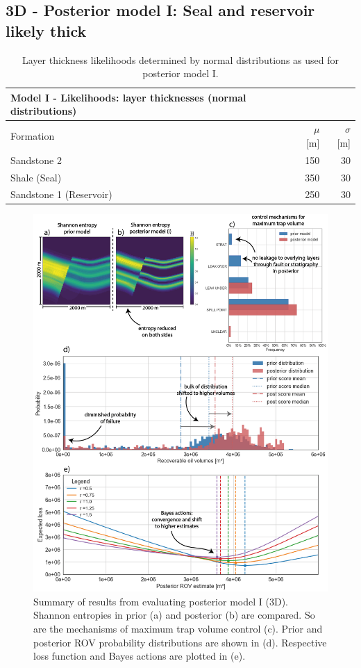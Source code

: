 		\subsection{3D - Posterior model I: Seal and reservoir likely thick}
		\begin{table}[h]
			\centering
			\begin{tabular}{lrr} 
				\toprule
				Model I - Likelihoods: layer thicknesses (normal distributions)\\  
				\midrule 
				Formation & $\mu$ [m] & $\sigma$ [m]\\ 
				\midrule 
				Sandstone 2 & 150 & 30 \\
				Shale (Seal) & 350 & 30\\ 
				Sandstone 1 (Reservoir) & 250 & 30 \\
				\bottomrule
			\end{tabular}
			\caption{Layer thickness likelihoods determined by normal distributions as used for posterior model I.}
			\label{tab:ML1_likelihoods}
		\end{table}
		\begin{figure}[p!]
			\centering
			\includegraphics[width=1\textwidth]{Figures/ML1}
			\caption{Summary of results from evaluating posterior model I (3D). Shannon entropies in prior (a) and posterior (b) are compared. So are the mechanisms of maximum trap volume control (c). Prior and posterior ROV probability distributions are shown in (d). Respective loss function and Bayes actions are plotted in (e).}\label{fig:ML1}
		\end{figure}		
